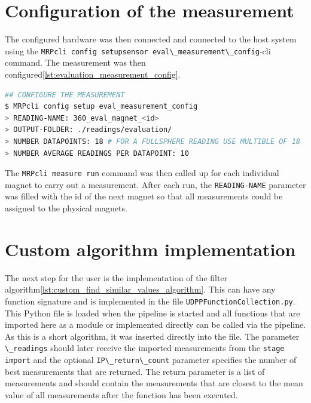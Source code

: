 \hypertarget{configuration-of-the-measurement}{%
\section{Configuration of the
measurement}\label{configuration-of-the-measurement}}

The configured hardware was then connected and connected to the host
system using the
\passthrough{\lstinline!MRPcli config setupsensor eval\_measurement\_config!}-\gls{cli}
command. The measurement was then
configured\ref{lst:evaluation_measurement_config}.

\begin{lstlisting}[language=bash, caption={Measurement configuration for evaluation measurement}, label=lst:evaluation_measurement_config]
## CONFIGURE THE MEASUREMENT
$ MRPcli config setup eval_measurement_config
> READING-NAME: 360_eval_magnet_<id>
> OUTPUT-FOLDER: ./readings/evaluation/
> NUMBER DATAPOINTS: 18 # FOR A FULLSPHERE READING USE MULTIBLE OF 18
> NUMBER AVERAGE READINGS PER DATAPOINT: 10
\end{lstlisting}

The \passthrough{\lstinline!MRPcli measure run!} command was then called
up for each individual magnet to carry out a measurement. After each
run, the \passthrough{\lstinline!READING-NAME!} parameter was filled
with the id of the next magnet so that all measurements could be
assigned to the physical magnets.

\hypertarget{custom-algorithm-implementation}{%
\section{Custom algorithm
implementation}\label{custom-algorithm-implementation}}

The next step for the user is the implementation of the filter
algorithm\ref{lst:custom_find_similar_values_algorithm}. This can have
any function signature and is implemented in the file
\passthrough{\lstinline!UDPPFunctionCollection.py!}. This Python file is
loaded when the pipeline is started and all functions that are imported
here as a module or implemented directly can be called via the pipeline.
As this is a short algorithm, it was inserted directly into the file.
The parameter \passthrough{\lstinline!\_readings!} should later receive
the imported measurements from the
\passthrough{\lstinline!stage import!} and the optional
\passthrough{\lstinline!IP\_return\_count!} parameter specifies the
number of best measurements that are returned. The return parameter is a
list of measurements and should contain the measurements that are
closest to the mean value of all measurements after the function has
been executed.

